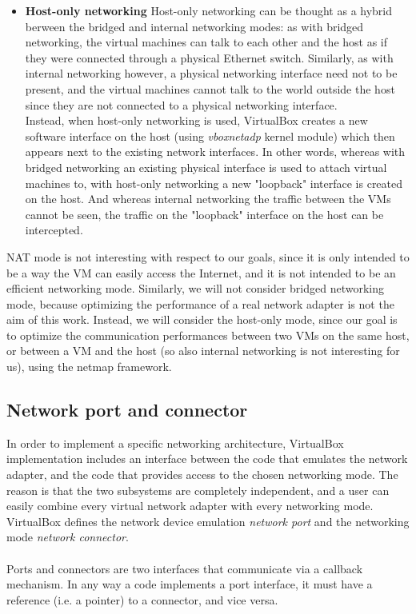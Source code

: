\documentclass[a4paper, 12pt, titlepage]{report}
\begin{document}
\begin{itemize}
\item \textbf{Host-only networking} Host-only networking can be thought as a hybrid berween the bridged and internal networking modes: as with bridged networking, the virtual machines can talk to each other and the host as if they were connected through a physical Ethernet switch. Similarly, as with internal networking however, a physical networking interface need not to be present, and the virtual machines cannot talk to the world outside the host since they are not connected to a physical networking interface.
\\
Instead, when host-only networking is used, VirtualBox creates a new software interface on the host (using \textit{vboxnetadp} kernel module) which then appears next to the existing network interfaces. In other words, whereas with bridged networking an existing physical interface is used to attach virtual machines to, with host-only networking a new "loopback" interface is created on the host. And whereas internal networking the traffic between the VMs cannot be seen, the traffic on the "loopback" interface on the host can be intercepted.
\end{itemize}
NAT mode is not interesting with respect to our goals, since it is only intended to be a way the VM can easily access the Internet, and it is not intended to be an efficient networking mode. Similarly, we will not consider bridged networking mode, because optimizing the performance of a real network adapter is not the aim of this work. Instead, we will consider the host-only mode, since our goal is to optimize the communication performances between two VMs on the same host, or between a VM and the host (so also internal networking is not interesting for us), using the netmap framework.

\subsection{Network port and connector} \label{subsec:port_conn}
In order to implement a specific networking architecture, VirtualBox implementation includes an interface between the code that emulates the network adapter, and the code that provides access to the chosen networking mode. The reason is that the two subsystems are completely independent, and a user can easily combine every virtual network adapter with every networking mode.
\\
VirtualBox defines the network device emulation \textit{network port} and the networking mode \textit{network connector}.
\\
\\
Ports and connectors are two interfaces that communicate via a callback mechanism. In any way a code implements a port interface, it must have a reference (i.e. a pointer) to a connector, and vice versa.
\end{document}

